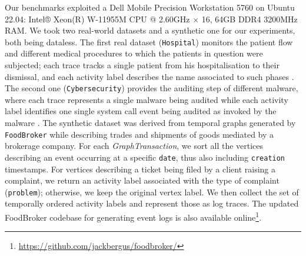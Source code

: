 \documentclass[sigconf]{acmart}
\begin{document}
Our benchmarks exploited a Dell Mobile Precision Workstation 5760 on Ubuntu 22.04: Intel® Xeon(R) W-11955M CPU @ 2.60GHz $\times$ 16, 64GB DDR4 3200MHz RAM. We took two real-world datasets and a synthetic one for our experiments, both being dataless. The first real dataset (\texttt{Hospital}) monitors the patient flow and different medical procedures to which the patients in question were subjected; each trace tracks a single patient from his hospitalisation to their dismissal, and each activity label describes the name associated to such phases \cite{https://doi.org/10.4121/uuid:d9769f3d-0ab0-4fb8-803b-0d1120ffcf54}. The second one (\texttt{Cybersecurity}) provides the auditing step of different malware, where each trace represents  a single malware being audited while each activity label identifies one single system call event being audited as invoked by the malware \cite{10.7717/peerj-cs.346,DBLP:conf/siu/YaziCG19}.  The synthetic dataset was derived from temporal graphs generated by \texttt{FoodBroker} \cite{DBLP:conf/wbdb/PetermannJMR14} while describing trades and shipments of goods  mediated by a brokerage company. For each \textit{GraphTransaction}, we sort all the vertices describing an event occurring at a specific \texttt{date}, thus also including  \texttt{creation} timestamps. For vertices describing a ticket being filed by a client raising a complaint, we return an activity label associated with the type of complaint (\texttt{problem}); otherwise, we keep the original vertex label. We then collect the set of temporally ordered activity labels and represent those as log traces. The updated FoodBroker codebase for generating event logs is also available online\footnote{\url{https://github.com/jackbergus/foodbroker/}}.
\end{document}
